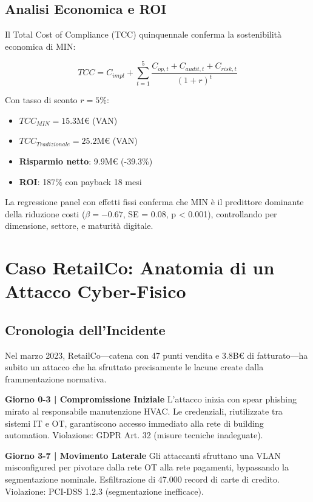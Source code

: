 \subsection{\texorpdfstring{Analisi Economica e ROI}{4.3.3 - Analisi Economica e ROI}}

Il Total Cost of Compliance (TCC) quinquennale conferma la sostenibilità economica di MIN:

\begin{equation}
TCC = C_{impl} + \sum_{t=1}^{5} \frac{C_{op,t} + C_{audit,t} + C_{risk,t}}{(1+r)^t}
\end{equation}

Con tasso di sconto $r = 5\%$:
\begin{itemize}
\item $TCC_{MIN} = 15.3$M€ (VAN)
\item $TCC_{Tradizionale} = 25.2$M€ (VAN)
\item \textbf{Risparmio netto}: 9.9M€ (-39.3\%)
\item \textbf{ROI}: 187\% con payback 18 mesi
\end{itemize}

La regressione panel con effetti fissi conferma che MIN è il predittore dominante della riduzione costi ($\beta = -0.67$, SE = 0.08, p < 0.001), controllando per dimensione, settore, e maturità digitale.

\section{\texorpdfstring{Caso RetailCo: Anatomia di un Attacco Cyber-Fisico}{4.4 - Caso RetailCo}}
\label{sec:caso_studio}

\subsection{\texorpdfstring{Cronologia dell'Incidente}{4.4.1 - Cronologia dell'Incidente}}

Nel marzo 2023, RetailCo—catena con 47 punti vendita e 3.8B€ di fatturato—ha subito un attacco che ha sfruttato precisamente le lacune create dalla frammentazione normativa.

\textbf{Giorno 0-3 | Compromissione Iniziale}
L'attacco inizia con spear phishing mirato al responsabile manutenzione HVAC. Le credenziali, riutilizzate tra sistemi IT e OT, garantiscono accesso immediato alla rete di building automation. Violazione: GDPR Art. 32 (misure tecniche inadeguate).

\textbf{Giorno 3-7 | Movimento Laterale}
Gli attaccanti sfruttano una VLAN misconfigured per pivotare dalla rete OT alla rete pagamenti, bypassando la segmentazione nominale. Esfiltrazione di 47.000 record di carte di credito. Violazione: PCI-DSS 1.2.3 (segmentazione inefficace).

